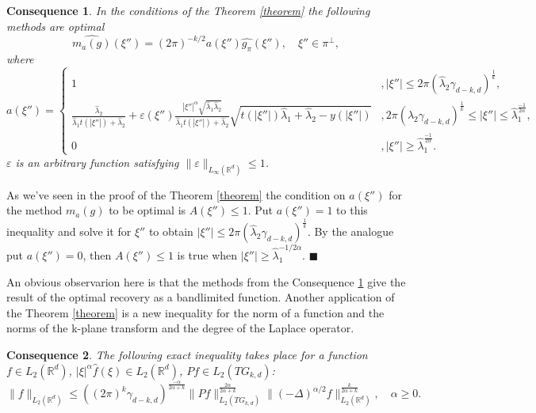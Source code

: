 \documentclass[12pt]{iopart}
\newtheorem{conseq}{Consequence}
\newenvironment{proof}
{\par\noindent{\bf Proof}}
{\hfill$\scriptstyle\blacksquare$}
\begin{document}
\begin{conseq}
\label{cons}
In the conditions of the Theorem \ref{theorem} the following methods are optimal $$
\widehat{m_a(g)}(\xi'')=(2\pi)^{-k/2}a(\xi'')\widehat{g_\pi }(\xi''),\quad \xi''\in\pi^\perp,$$ where
  \[
a(\xi'')=
  \begin{cases}
    1& ,|\xi''|\le 2\pi(\widehat\lambda_2\gamma_{d-k,d})^\frac{1}{k},\\
    \frac{\widehat\lambda_2}{\widehat\lambda_1t(|\xi''|)+\widehat\lambda_2}+\varepsilon(\xi'')\frac{|\xi''|^\alpha\sqrt{\widehat\lambda_1\widehat\lambda_2}}{\widehat\lambda_1t(|\xi''|)+\widehat\lambda_2}\sqrt{t(|\xi''|)\widehat\lambda_1+\widehat\lambda_2-y(|\xi''|)}& ,2\pi(\widehat\lambda_2\gamma_{d-k,d})^\frac{1}{k} \le|\xi''|\le \widehat\lambda_1^{\frac{-1}{2\alpha}},\\
    0 &,|\xi''|\ge\widehat\lambda_1^{\frac{-1}{2\alpha}}.
  \end{cases}
\]
$\varepsilon$ is an arbitrary function satisfying $\|\varepsilon\|_{L_\infty(\mathbb R^d)}\le 1$.
\end{conseq}

\begin{proof}
As we've seen in the proof of the Theorem \ref{theorem} the condition on $a(\xi'')$ for the method $m_a(g)$ to be optimal is $A(\xi'')\leqslant 1$. Put $a(\xi'')=1$ to this inequality and solve it for $\xi''$ to obtain $|\xi''|\le 2\pi(\widehat\lambda_2\gamma_{d-k,d})^\frac{1}{k}$. By the analogue put $a(\xi'')=0$,
  then $A(\xi'')\leqslant 1$ is true when $|\xi''|\geqslant
  \widehat\lambda_1^{-1/{2\alpha}}$.
\end{proof}

An obvious observarion here is that the methods from the Consequence \ref{cons} give the result of the optimal recovery as a bandlimited function. Another application of the Theorem \ref{theorem} is a new inequality for the norm of a function and the norms of the k-plane transform and the degree of the Laplace operator.


\begin{conseq}
\label{cons2}
The following exact inequality takes place for a function $f\in L_2(\mathbb R^d)$, $|\xi|^\alpha\widehat f(\xi)\in L_2(\mathbb R^d)$, $Pf\in L_2(TG_{k,d})$:
\[
\|f\|_{L_2(\mathbb R^d)}\leqslant
((2\pi)^k\gamma_{d-k,d})^{\frac{-\alpha}{2\alpha+k}}\|Pf\|_{L_2(TG_{k,d})}^{\frac{2\alpha}{2\alpha+k}}\|(-\Delta)^{\alpha/2}f\|_{L_2(\mathbb
  R^d)}^\frac{k}{2\alpha+k},\quad\alpha\ge0.
\]
\end{conseq}
\end{document}
